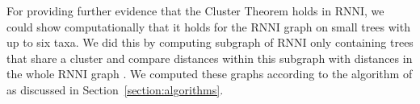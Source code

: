 \documentclass{amsart}
\newcommand{\rnni}{\mathrm{RNNI}}
\begin{document}
For providing further evidence that the Cluster Theorem holds in $\rnni$, we could show computationally that it holds for the $\rnni$ graph on small trees with up to six taxa.
We did this by computing subgraph of $\rnni$ only containing trees that share a cluster and compare distances within this subgraph with distances in the whole $\rnni$ graph \autocite{Collienne2019}.
We computed these graphs according to the algorithm of \autocite{Gavryushkin2018-ol} as discussed in Section~\ref{section:algorithms}.

\end{document}
